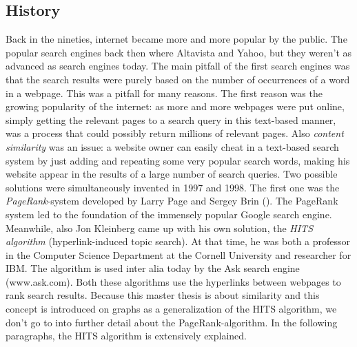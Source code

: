 \documentclass[a4paper,11pt]{report}
\begin{document}
\subsection{History}
Back in the nineties, internet became more and more popular by the public. The popular search 
engines back then where Altavista and Yahoo, but they weren't as advanced as 
search engines today. The main pitfall of the first search engines was that the search results 
were purely based on the number of occurrences of a word in a webpage. This was 
a pitfall for many reasons. The first reason was the growing popularity of the 
internet: as more and more webpages were put online, simply getting the relevant 
pages to a search query in this text-based manner, was a process that could possibly return millions 
of relevant pages. Also \emph{content similarity} was an issue: a website owner 
can easily cheat in a text-based search system by just adding and repeating some 
very popular search words, making his website appear in the results of a large 
number of search queries.
Two possible solutions were simultaneously invented in 1997 and 1998. The first 
one was the
\textit{PageRank}-system developed by Larry Page and Sergey 
Brin (\cite{page}). The PageRank system led to the foundation of the immensely popular Google 
search engine. Meanwhile, also Jon Kleinberg came up with his own solution, the\textit{ HITS algorithm} (hyperlink-induced topic search). At that time,
he was both a professor in the Computer Science Department at the Cornell University and researcher for IBM. The algorithm is 
used inter alia today by the Ask search engine (www.ask.com).
Both these algorithms use the hyperlinks between webpages to rank search 
results. 
Because this master thesis is about similarity and this concept is 
introduced on graphs as a generalization of the HITS algorithm, we don't go to into 
further detail about the PageRank-algorithm. In the following paragraphs, the 
HITS algorithm is extensively explained.
\end{document}
